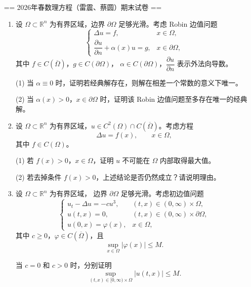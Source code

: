 
== 2026年春数理方程（雷震、蔡圆）期末试卷 ==

\begin{enumerate}

\item 设 $\Omega \subset \mathbb{R}^n$ 为有界区域，边界 $\partial \Omega$ 足够光滑。考虑 Robin 边值问题
\[
\begin{cases}
\Delta u = f, & x \in \Omega,\\[4pt]
\dfrac{\partial u}{\partial n}+\alpha(x)u=g, & x\in \partial\Omega,
\end{cases}
\]
其中 $f\in C(\overline{\Omega})$，$g\in C(\partial\Omega)$，
$\alpha\in C(\partial\Omega)$，$\dfrac{\partial u}{\partial n}$ 表示外法向导数。

(1) 当 $\alpha\equiv 0$ 时，证明若经典解存在，则解在相差一个常数的意义下唯一。
    
(2) 当 $\alpha(x)>0$，$x\in \partial\Omega$ 时，证明该 Robin 边值问题至多存在唯一的经典解。

\item 设 $\Omega\subset\mathbb{R}^n$ 为有界区域，$u\in C^2(\Omega)\cap C(\overline{\Omega})$。考虑方程
\[
\Delta u=f(x), \qquad x\in \Omega,
\]
其中 $f\in C(\Omega)$。

(1) 若 $f(x)>0$，$x\in\Omega$，证明 $u$ 不可能在 $\Omega$ 内部取得最大值。

(2) 若去掉条件 $f(x)>0$，上述结论是否仍然成立？请说明理由。

\item 设 $\Omega\subset\mathbb{R}^n$ 为有界区域，
边界 $\partial\Omega$ 足够光滑。考虑初边值问题
\[
\begin{cases}
u_t-\Delta u=-cu^3, & (t,x)\in (0,\infty)\times\Omega,\\[4pt]
u(t,x)=0, & (t,x)\in (0,\infty)\times\partial\Omega,\\[4pt]
u(0,x)=\varphi(x), & x\in \Omega,
\end{cases}
\]
其中 $c\geq 0$，$\varphi\in C(\overline{\Omega})$，且
\[
\sup_{x\in\Omega}|\varphi(x)|\leq M.
\]

当 $c=0$ 和 $c>0$ 时，分别证明
    \[
    \sup_{(t,x)\in [0,\infty)\times\Omega}|u(t,x)|\leq M.
    \]


\end{enumerate}
